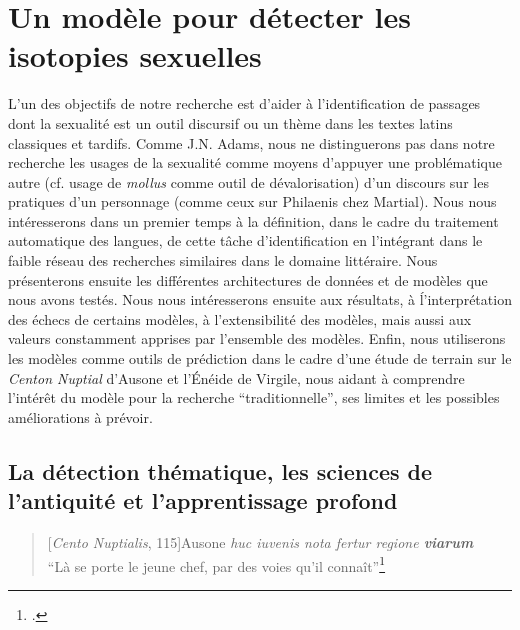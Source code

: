 \chapter{Un modèle pour détecter les isotopies sexuelles}

L'un des objectifs de notre recherche est d'aider à l'identification de passages dont la sexualité est un outil discursif ou un thème dans les textes latins classiques et tardifs. Comme J.N. Adams, nous ne distinguerons pas dans notre recherche les usages de la sexualité comme moyens d'appuyer une problématique autre (cf. usage de \textit{mollus} comme outil de dévalorisation) d'un discours sur les pratiques d'un personnage (comme ceux sur Philaenis chez Martial). Nous nous intéresserons dans un premier temps à la définition, dans le cadre du traitement automatique des langues, de cette tâche d'identification en l'intégrant dans le faible réseau des recherches similaires dans le domaine littéraire. Nous présenterons ensuite les différentes architectures de données et de modèles que nous avons testés. Nous nous intéresserons ensuite aux résultats, à ĺ'interprétation des échecs de certains modèles, à l'extensibilité des modèles, mais aussi aux valeurs constamment apprises par l'ensemble des modèles. Enfin, nous utiliserons les modèles comme outils de prédiction dans le cadre d'une étude de terrain sur le \textit{Centon Nuptial} d'Ausone et l'Énéide de Virgile, nous aidant à comprendre l'intérêt du modèle pour la recherche \enquote{traditionnelle}, ses limites et les possibles améliorations à prévoir.

\section{La détection thématique, les sciences de l'antiquité et l'apprentissage profond}


\begin{quote}[\textit{Cento Nuptialis}, 115]{Ausone}
    \textit{huc iuvenis nota fertur regione \textbf{viarum}} \\
    \enquote{Là se porte le jeune chef, par des voies qu'il connaît}\footcite{ausone_d_2010}
\end{quote}

